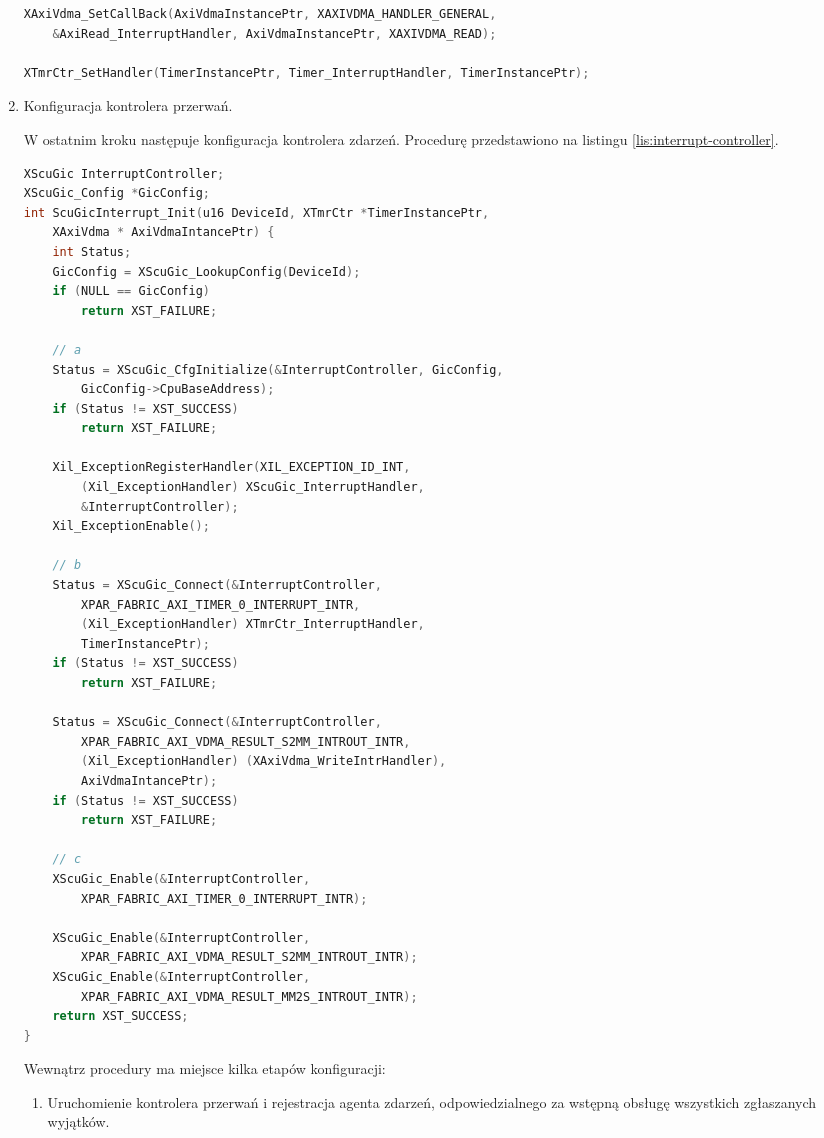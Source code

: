 \begin{enumerate}
\begin{lstlisting}[language=C, caption=Rejestracja agentów przerwań., label=lis:interrupt-handlers-2]
XAxiVdma_SetCallBack(AxiVdmaInstancePtr, XAXIVDMA_HANDLER_GENERAL,
	&AxiRead_InterruptHandler, AxiVdmaInstancePtr, XAXIVDMA_READ);

XTmrCtr_SetHandler(TimerInstancePtr, Timer_InterruptHandler, TimerInstancePtr);
\end{lstlisting}

	\item Konfiguracja kontrolera przerwań.
	
W ostatnim kroku następuje konfiguracja kontrolera zdarzeń. Procedurę przedstawiono na listingu \ref{lis:interrupt-controller}.

\begin{lstlisting}[language=C, caption=Konfiguracja kontrolera przerwań., label=lis:interrupt-controller]
XScuGic InterruptController;
XScuGic_Config *GicConfig;
int ScuGicInterrupt_Init(u16 DeviceId, XTmrCtr *TimerInstancePtr,
	XAxiVdma * AxiVdmaIntancePtr) {
	int Status;
	GicConfig = XScuGic_LookupConfig(DeviceId);
	if (NULL == GicConfig)
		return XST_FAILURE;
	
	// a
	Status = XScuGic_CfgInitialize(&InterruptController, GicConfig,
		GicConfig->CpuBaseAddress);
	if (Status != XST_SUCCESS)
		return XST_FAILURE;
	
	Xil_ExceptionRegisterHandler(XIL_EXCEPTION_ID_INT,
		(Xil_ExceptionHandler) XScuGic_InterruptHandler,
		&InterruptController);
	Xil_ExceptionEnable();
	
	// b
	Status = XScuGic_Connect(&InterruptController,
		XPAR_FABRIC_AXI_TIMER_0_INTERRUPT_INTR,
		(Xil_ExceptionHandler) XTmrCtr_InterruptHandler,
		TimerInstancePtr);
	if (Status != XST_SUCCESS)
		return XST_FAILURE;
	
	Status = XScuGic_Connect(&InterruptController,
		XPAR_FABRIC_AXI_VDMA_RESULT_S2MM_INTROUT_INTR,
		(Xil_ExceptionHandler) (XAxiVdma_WriteIntrHandler),
		AxiVdmaIntancePtr);
	if (Status != XST_SUCCESS)
		return XST_FAILURE;
	
	// c
	XScuGic_Enable(&InterruptController,
		XPAR_FABRIC_AXI_TIMER_0_INTERRUPT_INTR);
	
	XScuGic_Enable(&InterruptController,
		XPAR_FABRIC_AXI_VDMA_RESULT_S2MM_INTROUT_INTR);
	XScuGic_Enable(&InterruptController,
		XPAR_FABRIC_AXI_VDMA_RESULT_MM2S_INTROUT_INTR);
	return XST_SUCCESS;
}
\end{lstlisting}

Wewnątrz procedury ma miejsce kilka etapów konfiguracji:
\begin{enumerate}
	\item Uruchomienie kontrolera przerwań i rejestracja agenta zdarzeń, odpowiedzialnego za wstępną obsługę wszystkich zgłaszanych wyjątków.
	

\end{enumerate}
\end{enumerate}
